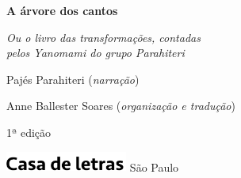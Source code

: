 




\begingroup\thispagestyle{empty}\vspace*{.05\textheight} 

              {\formular
              \huge
              \noindent
              \textbf{A árvore dos cantos}\\
              
              \vspace{-0.5cm}
              
              }

              \vspace{0.5cm}

              \noindent{}\textit{Ou o livro das transformações, contadas\\pelos Yanomami do  grupo Parahiteri}

              \vspace{1cm}
              

              \vfill              

              {\small
              \noindent{}Pajés Parahiteri (\textit{narração})
              }

              {\small
              \noindent{}Anne Ballester Soares (\textit{organização e tradução})
              }

              \vspace{0.5cm}

              {\small\noindent{}1ª edição}

              \vfill\noindent\includegraphics[width=0.3\textwidth]{LOGO_CDL.png}
              \break{} 
              \smallskip
              {\fontsize{30}{40}%
              \scriptsize\noindent São Paulo\quad\the\year}

\endgroup
\pagebreak
